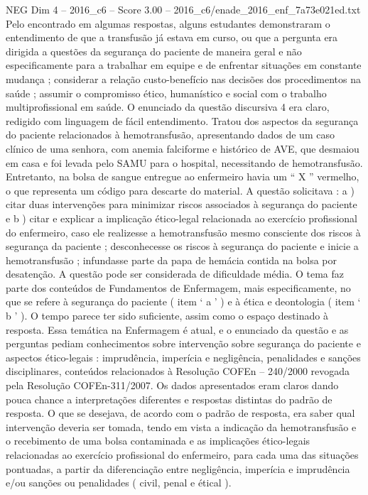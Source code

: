 \begin{textsample}{NEG Dim 4 – 2016\_c6 – Score 3.00 – 2016\_c6/enade\_2016\_enf\_7a73e021ed.txt}
Pelo encontrado em algumas respostas, alguns estudantes demonstraram o entendimento de que a transfusão já estava em curso, ou que a pergunta era dirigida a questões da segurança do paciente de maneira geral e não especificamente para a trabalhar em equipe e de enfrentar situações em constante mudança ; considerar a relação custo-benefício nas decisões dos procedimentos na saúde ; assumir o compromisso ético, humanístico e social com o trabalho multiprofissional em saúde.
O enunciado da questão discursiva 4 era claro, redigido com linguagem de fácil entendimento.
Tratou dos aspectos da segurança do paciente relacionados à hemotransfusão, apresentando dados de um caso clínico de uma senhora, com anemia falciforme e histórico de AVE, que desmaiou em casa e foi levada pelo SAMU para o hospital, necessitando de hemotransfusão.
Entretanto, na bolsa de sangue entregue ao enfermeiro havia um “ X ” vermelho, o que representa um código para descarte do material.
A questão solicitava : a ) citar duas intervenções para minimizar riscos associados à segurança do paciente e b ) citar e explicar a implicação ético-legal relacionada ao exercício profissional do enfermeiro, caso ele realizesse a hemotransfusão mesmo consciente dos riscos à segurança da paciente ; desconhecesse os riscos à segurança do paciente e inicie a hemotransfusão ; infundasse parte da papa de hemácia contida na bolsa por desatenção.
A questão pode ser considerada de dificuldade média.
O tema faz parte dos conteúdos de Fundamentos de Enfermagem, mais especificamente, no que se refere à segurança do paciente ( item ‘ a ’ ) e à ética e deontologia ( item ‘ b ’ ).
O tempo parece ter sido suficiente, assim como o espaço destinado à resposta.
Essa temática na Enfermagem é atual, e o enunciado da questão e as perguntas pediam conhecimentos sobre intervenção sobre segurança do paciente e aspectos ético-legais : imprudência, imperícia e negligência, penalidades e sanções disciplinares, conteúdos relacionados à Resolução COFEn – 240/2000 revogada pela Resolução COFEn-311/2007.
Os dados apresentados eram claros dando pouca chance a interpretações diferentes e respostas distintas do padrão de resposta.
O que se desejava, de acordo com o padrão de resposta, era saber qual intervenção deveria ser tomada, tendo em vista a indicação da hemotransfusão e o recebimento de uma bolsa contaminada e as implicações ético-legais relacionadas ao exercício profissional do enfermeiro, para cada uma das situações pontuadas, a partir da diferenciação entre negligência, imperícia e imprudência e/ou sanções ou penalidades ( civil, penal e étical ).

\end{textsample}
